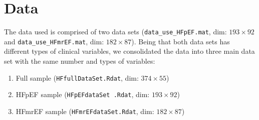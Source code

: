 \documentclass[../thesis.tex]{subfiles}
\begin{document}
\section{Data}
\label{sec:data}

\noindent The data used is comprised of two data sets (\texttt{data\_use\_HFpEF.mat}, dim: $193 \times 92$ and \texttt{data\_use\_HFmrEF.mat}, dim: $182 \times 87$). Being that both data sets has different types of clinical variables, we consolidated the data into three main data set with the same number and types of variables: 
\begin{enumerate}[label=(\roman*)]
    \item Full sample (\texttt{HFfullDataSet.Rdat}, dim: $374 \times 55$)
    \item HFpEF sample (\texttt{HFpEFdataSet .Rdat}, dim: $193 \times 92$)
    \item HFmrEF sample (\texttt{HFmrEFdataSet.Rdat}, dim: $182 \times 87$)
\end{enumerate}
\end{document}

